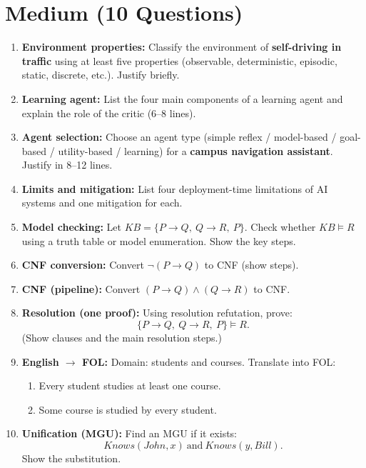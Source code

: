 \documentclass[11pt,a4paper]{article}
\begin{document}
\section*{Medium (10 Questions)}
\begin{enumerate}[label=M\arabic*., leftmargin=*]
  \item \textbf{Environment properties:} Classify the environment of \textbf{self-driving in traffic} using at least five properties
    (observable, deterministic, episodic, static, discrete, etc.). Justify briefly.

  \item \textbf{Learning agent:} List the four main components of a learning agent and explain the role of the critic (6--8 lines).

  \item \textbf{Agent selection:} Choose an agent type (simple reflex / model-based / goal-based / utility-based / learning)
    for a \textbf{campus navigation assistant}. Justify in 8--12 lines.

  \item \textbf{Limits and mitigation:} List four deployment-time limitations of AI systems and one mitigation for each.

  \item \textbf{Model checking:} Let $KB=\{P \rightarrow Q,\ Q \rightarrow R,\ P\}$.
    Check whether $KB \models R$ using a truth table or model enumeration. Show the key steps.

  \item \textbf{CNF conversion:} Convert $\lnot(P \rightarrow Q)$ to CNF (show steps).

  \item \textbf{CNF (pipeline):} Convert $(P \rightarrow Q) \land (Q \rightarrow R)$ to CNF.

  \item \textbf{Resolution (one proof):} Using resolution refutation, prove:
    \[
      \{P \rightarrow Q,\ Q \rightarrow R,\ P\} \models R.
    \]
    (Show clauses and the main resolution steps.)

  \item \textbf{English $\rightarrow$ FOL:} Domain: students and courses. Translate into FOL:
    \begin{enumerate}[label=(\alph*), leftmargin=*]
      \item Every student studies at least one course.
      \item Some course is studied by every student.
    \end{enumerate}

  \item \textbf{Unification (MGU):} Find an MGU if it exists:
    \[
      Knows(John, x)\ \text{and}\ Knows(y, Bill).
    \]
    Show the substitution.
\end{enumerate}
\end{document}
